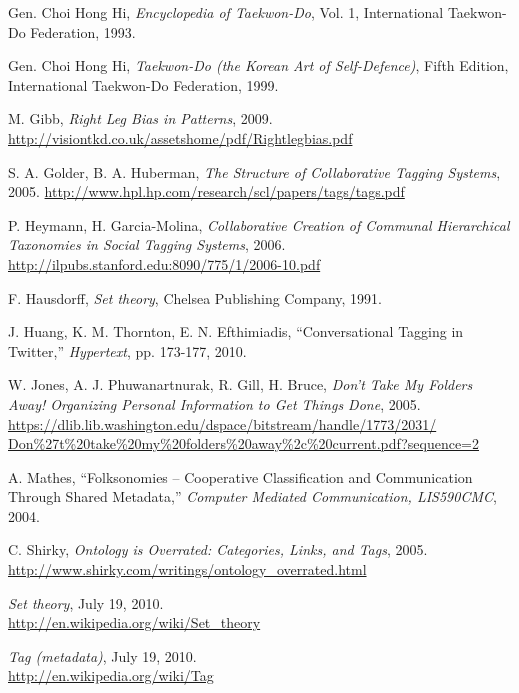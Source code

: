 \documentclass[10pt,twocolumn,a4paper]{article}
\begin{document}





\begin{thebibliography}{99}
    \small  %

      Gen. Choi Hong Hi,
      \emph{Encyclopedia of Taekwon-Do}, Vol. 1,
      International Taekwon-Do Federation, 1993.

      Gen. Choi Hong Hi,
      \emph{Taekwon-Do (the Korean Art of Self-Defence)}, Fifth Edition,
      International Taekwon-Do Federation, 1999.

      M. Gibb,
      \emph{Right Leg Bias in Patterns}, 2009.
      \url{http://visiontkd.co.uk/assetshome/pdf/Rightlegbias.pdf}

      S. A. Golder, B. A. Huberman,
      \emph{The Structure of Collaborative Tagging Systems}, 2005.
      \url{http://www.hpl.hp.com/research/scl/papers/tags/tags.pdf}

      P. Heymann, H. Garcia-Molina,
      \emph{Collaborative Creation of Communal Hierarchical Taxonomies in
      Social Tagging Systems}, 2006.
      \url{http://ilpubs.stanford.edu:8090/775/1/2006-10.pdf}

      F. Hausdorff,
      \emph{Set theory},
      Chelsea Publishing Company, 1991.

      J. Huang, K. M. Thornton, E. N. Efthimiadis,
      ``Conversational Tagging in Twitter,''
      \emph{Hypertext}, pp. 173-177, 2010.

      W. Jones, A. J. Phuwanartnurak, R. Gill, H. Bruce,
      \emph{Don't Take My Folders Away! Organizing Personal Information to Get
      Things Done}, 2005.
      \url{https://dlib.lib.washington.edu/dspace/bitstream/handle/1773/2031/
           Don%

      A. Mathes,
      ``Folksonomies -- Cooperative Classification and Communication Through
      Shared Metadata,''
      \emph{Computer Mediated Communication, LIS590CMC}, 2004.

      C. Shirky,
      \emph{Ontology is Overrated: Categories, Links, and Tags}, 2005.
      \url{http://www.shirky.com/writings/ontology_overrated.html}

      \emph{Set theory}, July 19, 2010. \\
      \url{http://en.wikipedia.org/wiki/Set_theory}

      \emph{Tag (metadata)}, July 19, 2010. \\
      \url{http://en.wikipedia.org/wiki/Tag}

\end{thebibliography}
\end{document}
